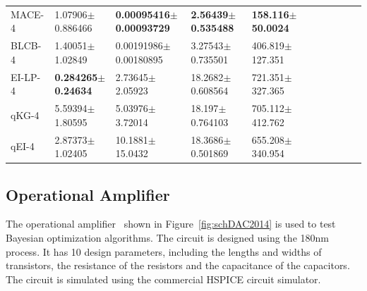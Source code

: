 \begin{table}[!htb]
\begin{tabular}{lllllllllll}
        MACE-4  & 1.07906$\pm$0.886466          &  \textbf{0.00095416$\pm$0.00093729} & \textbf{2.56439$\pm$0.535488} & \textbf{158.116$\pm$50.0024} \\
        BLCB-4  & 1.40051$\pm$1.02849           &  0.00191986$\pm$0.00180895          & 3.27543$\pm$0.735501          & 406.819$\pm$127.351 \\
        EI-LP-4 & \textbf{0.284265$\pm$0.24634} &  2.73645$\pm$2.05923                & 18.2682$\pm$0.608564          & 721.351$\pm$327.365 \\
        qKG-4   & 5.59394$\pm$1.80595           &  5.03976$\pm$3.72014                & 18.197$\pm$0.764103           & 705.112$\pm$412.762 \\
        qEI-4   & 2.87373$\pm$1.02405           &  10.1881$\pm$15.0432                & 18.3686$\pm$0.501869          & 655.208$\pm$340.954 \\
        \bottomrule
    \end{tabular}
\end{table}



\subsection{Operational Amplifier}


The operational amplifier~\cite{wang2014enabling} shown in
Figure~\ref{fig:schDAC2014} is used to test Bayesian optimization algorithms. The circuit is designed
using the 180nm process. It has 10 design parameters, including the lengths
and widths of transistors, the resistance of the resistors and the capacitance of the
capacitors. The circuit is simulated using the commercial HSPICE circuit simulator.

